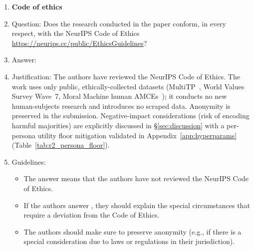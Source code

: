 \begin{enumerate}
\item {\bf Code of ethics}
    \item[] Question: Does the research conducted in the paper conform, in every respect, with the NeurIPS Code of Ethics \url{https://neurips.cc/public/EthicsGuidelines}?
    \item[] Answer: \answerYes{}
    \item[] Justification: The authors have reviewed the NeurIPS Code of Ethics. The work uses only public, ethically-collected datasets (MultiTP~\citep{jin2025multitp}, World Values Survey Wave~7, Moral Machine human AMCEs~\citep{awad2018moral}); it conducts no new human-subjects research and introduces no scraped data. Anonymity is preserved in the submission. Negative-impact considerations (risk of encoding harmful majorities) are explicitly discussed in \S\ref{sec:discussion} with a per-persona utility floor mitigation validated in Appendix~\ref{app:hyperparams} (Table~\ref{tab:r2_persona_floor}).
    \item[] Guidelines:
    \begin{itemize}
        \item The answer \answerNA{} means that the authors have not reviewed the NeurIPS Code of Ethics.
        \item If the authors answer \answerNo, they should explain the special circumstances that require a deviation from the Code of Ethics.
        \item The authors should make sure to preserve anonymity (e.g., if there is a special consideration due to laws or regulations in their jurisdiction).
    \end{itemize}



\end{enumerate}
